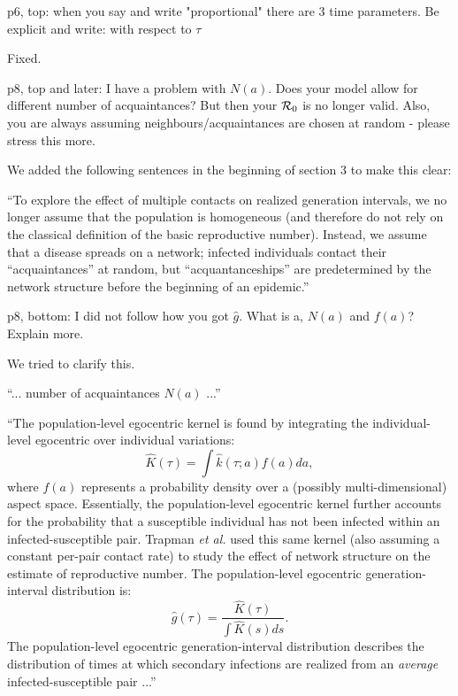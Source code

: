 \documentclass[12pt]{article}
\newcommand{\RR}{\ensuremath{{\cal R}}}
\newcommand{\revtext}{\textsf}
\begin{document}
\revtext{p6, top: when you say and write "proportional" there are 3 time parameters. Be explicit and write: with respect to $\tau$}

Fixed.

\revtext{p8, top and later: I have a problem with $N(a)$. Does your model allow for different number of acquaintances? But then your $\RR_0$ is no longer valid. Also, you are always assuming neighbours/acquaintances are chosen at random - please stress this more.}

We added the following sentences in the beginning of section 3 to make this clear:

``To explore the effect of multiple contacts on realized generation intervals, we no longer assume that the population is homogeneous (and therefore do not rely on the classical definition of the basic reproductive number).
Instead, we assume that a disease spreads on a network;
infected individuals contact their ``acquaintances'' at random, but ``acquantanceships'' are predetermined by the network structure before the beginning of an epidemic.''

\revtext{p8, bottom: I did not follow how you got $\hat g$. What is a, $N(a)$ and $f(a)$? Explain more.}

We tried to clarify this.

``... number of acquaintances $N(a)$ ...''

``The population-level egocentric kernel is found by integrating the individual-level egocentric over individual variations:
\begin{equation}\label{eq:ego}
\hat{K}(\tau) = \int \hat{k}(\tau; a) f(a) da,
\end{equation}
where $f(a)$ represents a probability density over a (possibly multi-dimensional) aspect space.
Essentially, the population-level egocentric kernel further accounts for the probability that a susceptible individual has not been infected within an infected-susceptible pair.
Trapman \textit{et al.} used this same kernel (also assuming a constant per-pair contact rate) to study the effect of network structure on the estimate of reproductive number.
The population-level egocentric generation-interval distribution is:
\begin{equation}
\hat{g}(\tau) = \frac{\hat{K}(\tau)}{\int \hat{K}(s) ds}.
\label{eq:conditional}
\end{equation}
The population-level egocentric generation-interval distribution describes the distribution of times at which secondary infections are realized from an \emph{average} infected-susceptible pair ...''
\end{document}
